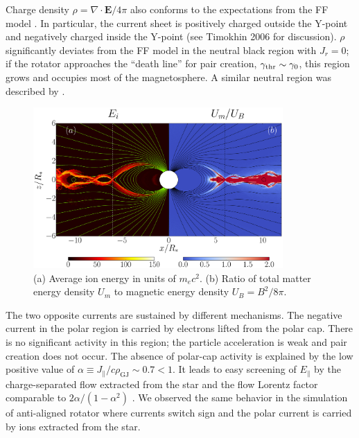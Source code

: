 Charge density $\rho=\nabla\cdot \mathbf{E}/4\pi$
also conforms to the expectations from the FF model
\citep[cf. Figure~16 in][]{parfrey_introducing_2012}.
In particular, the current sheet is positively charged outside the Y-point and
negatively charged inside the Y-point
(see Timokhin 2006 for discussion).
$\rho$ significantly deviates from the FF model in the neutral black region with
$J_r=0$; if the rotator approaches the ``death line''  for pair creation,
$\gamma_{\rm thr}\sim\gamma_0$, this region grows and occupies most of the magnetosphere.
A similar neutral
 region was described by
 \citet{yuki_particle_2012}.

\begin{figure}[t]
    \centering
    \includegraphics[width=0.85\textwidth]{pics/chap3/figure3.eps}
    \caption[Energy densities of type I aligned rotator]{\small
    (a) Average ion energy in units of $m_ec^2$. (b) Ratio of total matter energy density
    $U_m$ to magnetic energy density $U_B=B^2/8\pi$.
}
    \label{fig:gamma-U-photon}
\end{figure}


The two opposite currents are sustained by different mechanisms.
The negative current in the polar region is carried by electrons lifted
from the polar cap. There is no significant activity in this region;
the particle acceleration is weak and pair creation does not occur. The absence
of polar-cap activity is explained by the low positive value of
$\alpha\equiv J_\parallel/c\rho_\mathrm{GJ}\sim 0.7 <1$.
It leads to easy screening of $E_\parallel$ by the charge-separated
flow extracted from the star and the flow Lorentz factor
comparable to $2\alpha/(1-\alpha^2)$
\citep{beloborodov_polar-cap_2008,chen_dead_2013}.
We observed the same behavior in the simulation of anti-aligned rotator where currents
switch sign and the polar current is carried by ions extracted from the star.

